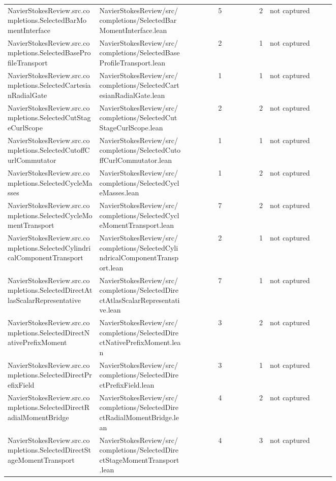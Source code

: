 \documentclass[10pt]{article}
\begin{document}
\begin{longtable}{p{0.28\linewidth}p{0.27\linewidth}r r p{0.20\linewidth}}
NavierStokesReview.src.completions.SelectedBarMomentInterface & NavierStokesReview/src/completions/SelectedBarMomentInterface.lean & 5 & 2 & not captured\\
NavierStokesReview.src.completions.SelectedBaseProfileTransport & NavierStokesReview/src/completions/SelectedBaseProfileTransport.lean & 2 & 1 & not captured\\
NavierStokesReview.src.completions.SelectedCartesianRadialGate & NavierStokesReview/src/completions/SelectedCartesianRadialGate.lean & 1 & 1 & not captured\\
NavierStokesReview.src.completions.SelectedCutStageCurlScope & NavierStokesReview/src/completions/SelectedCutStageCurlScope.lean & 2 & 2 & not captured\\
NavierStokesReview.src.completions.SelectedCutoffCurlCommutator & NavierStokesReview/src/completions/SelectedCutoffCurlCommutator.lean & 1 & 1 & not captured\\
NavierStokesReview.src.completions.SelectedCycleMasses & NavierStokesReview/src/completions/SelectedCycleMasses.lean & 1 & 2 & not captured\\
NavierStokesReview.src.completions.SelectedCycleMomentTransport & NavierStokesReview/src/completions/SelectedCycleMomentTransport.lean & 7 & 2 & not captured\\
NavierStokesReview.src.completions.SelectedCylindricalComponentTransport & NavierStokesReview/src/completions/SelectedCylindricalComponentTransport.lean & 2 & 1 & not captured\\
NavierStokesReview.src.completions.SelectedDirectAtlasScalarRepresentative & NavierStokesReview/src/completions/SelectedDirectAtlasScalarRepresentative.lean & 7 & 1 & not captured\\
NavierStokesReview.src.completions.SelectedDirectNativePrefixMoment & NavierStokesReview/src/completions/SelectedDirectNativePrefixMoment.lean & 3 & 2 & not captured\\
NavierStokesReview.src.completions.SelectedDirectPrefixField & NavierStokesReview/src/completions/SelectedDirectPrefixField.lean & 3 & 1 & not captured\\
NavierStokesReview.src.completions.SelectedDirectRadialMomentBridge & NavierStokesReview/src/completions/SelectedDirectRadialMomentBridge.lean & 4 & 2 & not captured\\
NavierStokesReview.src.completions.SelectedDirectStageMomentTransport & NavierStokesReview/src/completions/SelectedDirectStageMomentTransport.lean & 4 & 3 & not captured\\

\end{longtable}
\end{document}
